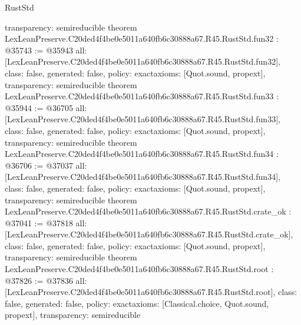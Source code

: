 \begin{lexlean}{RustStd}
\begin{coremodule}
{  transparency: semireducible
}
theorem LexLeanPreserve.C20ded4f4be0e5011a640fb6c30888a67.R45.RustStd.fun32 : @35743 := @35943 {
  all: [LexLeanPreserve.C20ded4f4be0e5011a640fb6c30888a67.R45.RustStd.fun32],
  class: false,
  generated: false,
  policy: exact{axioms: [Quot.sound, propext]},
  transparency: semireducible
}
theorem LexLeanPreserve.C20ded4f4be0e5011a640fb6c30888a67.R45.RustStd.fun33 : @35944 := @36705 {
  all: [LexLeanPreserve.C20ded4f4be0e5011a640fb6c30888a67.R45.RustStd.fun33],
  class: false,
  generated: false,
  policy: exact{axioms: [Quot.sound, propext]},
  transparency: semireducible
}
theorem LexLeanPreserve.C20ded4f4be0e5011a640fb6c30888a67.R45.RustStd.fun34 : @36706 := @37037 {
  all: [LexLeanPreserve.C20ded4f4be0e5011a640fb6c30888a67.R45.RustStd.fun34],
  class: false,
  generated: false,
  policy: exact{axioms: [Quot.sound, propext]},
  transparency: semireducible
}
theorem LexLeanPreserve.C20ded4f4be0e5011a640fb6c30888a67.R45.RustStd.crate_ok : @37041 := @37818 {
  all: [LexLeanPreserve.C20ded4f4be0e5011a640fb6c30888a67.R45.RustStd.crate_ok],
  class: false,
  generated: false,
  policy: exact{axioms: [Quot.sound, propext]},
  transparency: semireducible
}
theorem LexLeanPreserve.C20ded4f4be0e5011a640fb6c30888a67.R45.RustStd.root : @37826 := @37836 {
  all: [LexLeanPreserve.C20ded4f4be0e5011a640fb6c30888a67.R45.RustStd.root],
  class: false,
  generated: false,
  policy: exact{axioms: [Classical.choice, Quot.sound, propext]},
  transparency: semireducible
}


\end{coremodule}
\end{lexlean}

